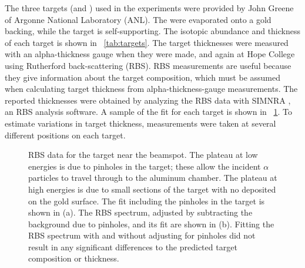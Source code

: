 The three targets (\GeTargets and ) used in the experiments were provided by John Greene of Argonne National Laboratory (ANL).  The \GeTargets were evaporated onto a gold backing, while the  target is self-supporting.  The isotopic abundance and thickness of each target is shown in {\tab}~\ref{tab:targets}.  The target thicknesses were measured with an alpha-thickness gauge when they were made, and again at Hope College using Rutherford back-scattering (RBS).  RBS measurements are useful because they give information about the target composition, which must be assumed when calculating target thickness from alpha-thickness-gauge measurements.  The reported thicknesses were obtained by analyzing the RBS data with SIMNRA \cite{SIMNRA}, an RBS analysis software.  A sample of the fit for each target is shown in {\fig}~\ref{fig:RBS_sample}.  To estimate variations in target thickness, measurements were taken at several different positions on each target.
\begin{figure}[!htbp]
\centering
{}
\caption{RBS data for the  target near the beamspot.  The plateau at low energies is due to pinholes in the target; these allow the incident $\alpha$ particles to travel through to the aluminum chamber.  The plateau at high energies is due to small sections of the target with no  deposited on the gold surface.  The fit including the pinholes in the target is shown in (a).  The RBS spectrum, adjusted by subtracting the background due to pinholes, and its fit are shown in (b).  Fitting the RBS spectrum with and without adjusting for pinholes did not result in any significant differences to the predicted target composition or thickness.}
\label{fig:RBS_sample}
\end{figure}
